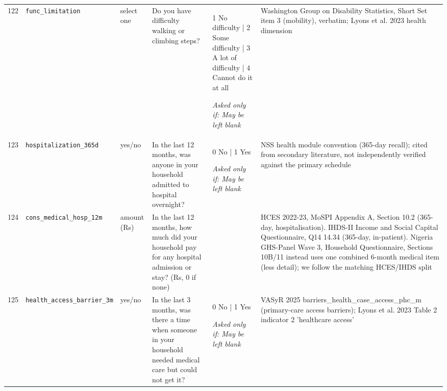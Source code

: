 \documentclass[9pt,a4paper,landscape]{article}
\begin{document}
\begin{longtable}{@{}p{0.5cm}p{3.3cm}p{1.7cm}p{7.3cm}p{5.6cm}p{5.4cm}@{}}
\footnotesize 122 & \footnotesize\texttt{func\_limitation} & \scriptsize select one & \footnotesize Do you have difficulty walking or climbing steps?\par\vspace{1pt}{\footnotesize\color{hdr}{\hifont क्या आपको चलने या सीढ़ियाँ चढ़ने में दिक़्क़त होती है?}} & \scriptsize 1 No difficulty | 2 Some difficulty | 3 A lot of difficulty | 4 Cannot do it at all\par\vspace{1pt}\textit{Asked only if: May be left blank} & \scriptsize Washington Group on Disability Statistics, Short Set item 3 (mobility), verbatim; Lyons et al. 2023 health dimension\\
\footnotesize 123 & \footnotesize\texttt{hospitalization\_365d} & \scriptsize yes/no & \footnotesize In the last 12 months, was anyone in your household admitted to hospital overnight?\par\vspace{1pt}{\footnotesize\color{hdr}{\hifont पिछले 12 महीनों में क्या आपके घर का कोई रात भर के लिए अस्पताल में भर्ती हुआ?}} & \scriptsize 0 No | 1 Yes\par\vspace{1pt}\textit{Asked only if: May be left blank} & \scriptsize NSS health module convention (365-day recall); cited from secondary literature, not independently verified against the primary schedule\\
\footnotesize 124 & \footnotesize\texttt{cons\_medical\_hosp\_12m} & \scriptsize amount (Rs) & \footnotesize In the last 12 months, how much did your household pay for any hospital admission or stay? (Rs, 0 if none)\par\vspace{1pt}{\footnotesize\color{hdr}{\hifont पिछले 12 महीनों में अस्पताल में भर्ती होने पर आपके घर का कितना ख़र्च हुआ? (रुपये, न हुआ हो तो 0)}} & \scriptsize  & \scriptsize HCES 2022-23, MoSPI Appendix A, Section 10.2 (365-day, hospitalisation). IHDS-II Income and Social Capital Questionnaire, Q14 14.34 (365-day, in-patient). Nigeria GHS-Panel Wave 3, Household Questionnaire, Sections 10B/11 instead uses one combined 6-month medical item (less detail); we follow the matching HCES/IHDS split\\
\footnotesize 125 & \footnotesize\texttt{health\_access\_barrier\_3m} & \scriptsize yes/no & \footnotesize In the last 3 months, was there a time when someone in your household needed medical care but could not get it?\par\vspace{1pt}{\footnotesize\color{hdr}{\hifont पिछले 3 महीनों में क्या कभी ऐसा हुआ कि आपके घर में किसी को इलाज की ज़रूरत थी पर मिल नहीं पाया?}} & \scriptsize 0 No | 1 Yes\par\vspace{1pt}\textit{Asked only if: May be left blank} & \scriptsize VASyR 2025 barriers\_health\_case\_access\_phc\_m (primary-care access barriers); Lyons et al. 2023 Table 2 indicator 2 'healthcare access'\\

\end{longtable}
\end{document}
